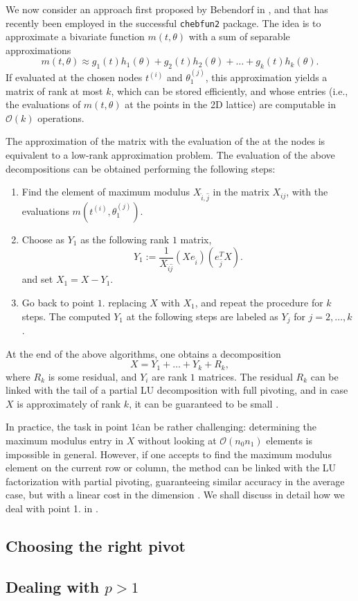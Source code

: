 \documentclass[]{article}
\begin{document}
We now consider an approach first proposed by Bebendorf 
in \cite{bebendorf2003adaptive}, and that has recently been employed in 
the successful \texttt{chebfun2} package. The idea is 
to approximate a bivariate function $m(t, \theta)$ with a 
sum of separable approximations
\[
    m(t, \theta) \approx 
      g_1(t) h_1(\theta) + g_2(t) h_2(\theta) + \ldots 
      + g_k(t) h_k(\theta). 
\]
If evaluated at the chosen nodes $t^{(i)}$ and 
$\theta_1^{(j)}$, this approximation yields a matrix 
of rank at most $k$, which can be stored efficiently, and 
whose entries (i.e., the evaluations of $m(t,\theta)$ at the 
points in the 2D lattice) are computable in $\mathcal O(k)$ 
operations. 

The approximation of the matrix with the  evaluation of the  
at the nodes is equivalent to a low-rank approximation 
problem. The evaluation of the above decompositions 
can be obtained performing the following 
steps:
\begin{enumerate}
    \item Find the element of maximum modulus  $X_{\hat i, \hat j}$
      in the matrix 
      $X_{ij}$, with the evaluations 
      $m(t^{(i)}, \theta_1^{(j)})$. 
    \item Choose as $Y_1$ as the following rank $1$ matrix,
      \[
          Y_1 := \frac{1}{X_{\hat i \hat j}} 
            (X e_{\hat i}) (e_{\hat j}^T X).
      \]
      and set $X_1 = X - Y_1$. 
    \item Go back to point $1.$ replacing $X$ with $X_1$, and repeat 
      the procedure for $k$ steps. The computed $Y_1$ at the following 
      steps are labeled as $Y_j$ for $j = 2, \ldots, k$. 
\end{enumerate}

At the end of the above algorithms, one obtains a decomposition 
\[
    X = Y_1 + \ldots + Y_k + R_k, 
\]
where $R_k$ is some residual, and $Y_i$ are rank $1$ matrices. The 
residual $R_k$ can be linked with the tail of a partial LU decomposition 
with full pivoting, and in case $X$ is approximately of rank $k$, 
it can be guaranteed to be small \cite{bebendorf2003adaptive,townsend2013extension}. 

In practice, the task in point 1\. can be rather challenging: determining the
maximum modulus entry in $X$ without looking at $\mathcal O(n_0 n_1)$ 
elements is impossible in general. However, if one 
accepts to find the maximum modulus element on the current row 
or column, the method can be linked with the LU factorization 
with partial pivoting, guaranteeing similar accuracy 
in the average case, but with a linear 
cost in the dimension \cite{bebendorf2003adaptive}. 
We shall discuss in detail how we deal with
point 1. in . 

\subsection{Choosing the right pivot}
\label{sec:pivot-choice}

\subsection{Dealing with $p > 1$}
\label{eq:pgt1}



\end{document}
